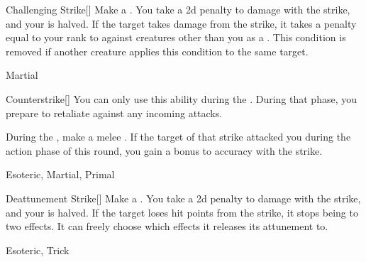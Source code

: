 \lowercase{\hypertarget{maneuver:Challenging Strike}{}}\label{maneuver:Challenging Strike}
\hypertarget{maneuver:Challenging Strike}{}
\begin{freeability}[Rank 2]{Challenging Strike}[]
Make a .
You take a \minus2d penalty to damage with the strike, and your  is halved.
If the target takes damage from the strike, it takes a penalty equal to your rank to  against creatures other than you as a .
This condition is removed if another creature applies this condition to the same target.


 Martial
\end{freeability}
\vspace{0.25em}



\lowercase{\hypertarget{maneuver:Counterstrike}{}}\label{maneuver:Counterstrike}
\hypertarget{maneuver:Counterstrike}{}
\begin{freeability}[Rank 2]{Counterstrike}[]
You can only use this ability during the .
During that phase, you prepare to retaliate against any incoming attacks.

During the , make a melee .
If the target of that strike attacked you during the action phase of this round,
you gain a  bonus to accuracy with the strike.


 Esoteric, Martial, Primal
\end{freeability}
\vspace{0.25em}



\lowercase{\hypertarget{maneuver:Deattunement Strike}{}}\label{maneuver:Deattunement Strike}
\hypertarget{maneuver:Deattunement Strike}{}
\begin{freeability}[Rank 2]{Deattunement Strike}[]
Make a .
You take a \minus2d penalty to damage with the strike, and your  is halved.
If the target loses hit points from the strike, it stops being  to two effects.
It can freely choose which effects it releases its attunement to.


 Esoteric, Trick
\end{freeability}
\vspace{0.25em}



